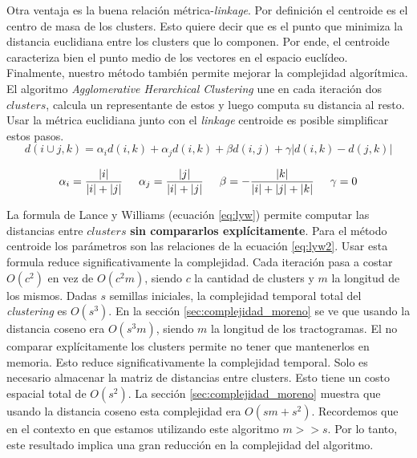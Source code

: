 Otra ventaja es la buena relaci\'on m\'etrica-\textit{linkage}. Por
definici\'on el centroide es el centro de masa de los clusters. Esto
quiere decir que es el punto que minimiza la distancia euclidiana entre
los clusters que lo componen. Por ende, el centroide caracteriza bien el
punto medio de los vectores en el espacio eucl\'ideo. \\

Finalmente, nuestro m\'etodo tambi\'en permite mejorar la complejidad
algor\'itmica. El algoritmo \textit{Agglomerative Herarchical Clustering}
une en cada iteraci\'on dos $clusters$, calcula un representante de estos
y luego computa su distancia al resto. Usar la m\'etrica euclidiana junto
con el \textit{linkage} centroide es posible simplificar estos pasos. \\

\begin{equation}
\label{eq:lyw}
d(i \cup j,k) = \alpha_i d(i,k) + \alpha_j d(i,k) + \beta d(i,j) + \gamma | d(i,k) - d(j,k) |
\end{equation}

\begin{equation}
\label{eq:lyw2}
\alpha_i = \frac{|i|}{|i|+|j|} \hspace{0.5cm}
\alpha_j = \frac{|j|}{|i|+|j|} \hspace{0.5cm}
\beta = -\frac{|k|}{|i|+|j|+|k|} \hspace{0.5cm}
\gamma = 0
\end{equation}


La formula de Lance y Williams (ecuaci\'on \ref{eq:lyw}) permite computar
las distancias entre $clusters$ {\bf sin compararlos expl\'icitamente}. 
Para el m\'etodo centroide los par\'ametros son las relaciones de la 
ecuaci\'on \ref{eq:lyw2}. Usar esta formula reduce significativamente la
complejidad. Cada iteraci\'on pasa a costar $O(c^2)$ en  vez de $O(c^2 m)$,
siendo $c$ la cantidad de clusters y $m$ la longitud de los mismos. Dadas
$s$ semillas iniciales, la complejidad temporal total del 
\textit{clustering} es $O(s^3)$.  En la secci\'on 
\ref{sec:complejidad_moreno} se ve que usando la distancia coseno era 
$O(s^3 m)$, siendo $m$ la longitud de los tractogramas. El no comparar 
expl\'icitamente los clusters permite no tener que mantenerlos en memoria.
Esto reduce significativamente la complejidad temporal. Solo es necesario
almacenar la matriz de distancias entre clusters. Esto tiene un costo
espacial total de $O(s^2)$. La secci\'on \ref{sec:complejidad_moreno} 
muestra que usando la distancia coseno esta complejidad era $O(sm +s^2)$.
Recordemos que en el contexto en que estamos utilizando este algoritmo
$m>>s$. Por lo tanto, este resultado implica una gran reducci\'on en la
complejidad del algoritmo. \\
